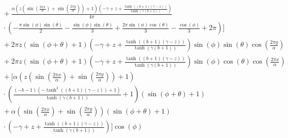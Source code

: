 \begin{align}
  &\quad + \frac{\alpha \left(z \left(\sin{\left (\frac{2 \pi x}{\alpha} \right )} + \sin{\left (\frac{2 \pi y}{\alpha} \right )}\right) + 1\right) \left(- \gamma + z + \frac{\tanh{\left (\left(b + 1\right) \left(\gamma - z\right) \right )}}{\tanh{\left (\gamma \left(b + 1\right) \right )}}\right)}{4 \pi} \nonumber\\
  &\quad \cdot \left(- \frac{\pi \sin{\left (\phi \right )} \sin{\left (\theta \right )}}{2} - \frac{\sin{\left(\phi\right)}\sin{\left(\theta\right)}}{3} + \frac{2 \pi \sin{\left (\phi \right )} \cos{\left (\theta \right )}}{3} - \frac{\cos{\left (\phi \right )}}{3} + 2 \pi\right) \Bigg] \nonumber\\
  &\quad + 2 \pi z \left(\sin{\left (\phi + \theta \right )} + 1\right) \left(- \gamma + z + \frac{\tanh{\left (\left(b + 1\right) \left(\gamma - z\right) \right )}}{\tanh{\left (\gamma \left(b + 1\right) \right )}}\right) \sin{\left (\phi \right )} \sin{\left (\theta \right )} \cos{\left (\frac{2 \pi y}{\alpha} \right )} \nonumber\\
  &\quad + 2 \pi z \left(\sin{\left (\phi + \theta \right )} + 1\right) \left(- \gamma + z + \frac{\tanh{\left (\left(b + 1\right) \left(\gamma - z\right) \right )}}{\tanh{\left (\gamma \left(b + 1\right) \right )}}\right) \sin{\left (\phi \right )} \cos{\left (\theta \right )} \cos{\left (\frac{2 \pi x}{\alpha} \right )} \nonumber\\
  &\quad + \Bigg[\alpha \left(z \left(\sin{\left (\frac{2 \pi x}{\alpha} \right )} + \sin{\left (\frac{2 \pi y}{\alpha} \right )}\right) + 1\right) \nonumber\\
  &\quad \cdot \left(\frac{\left(- b - 1\right) \left(- \tanh^{2}{\left (\left(b + 1\right) \left(\gamma - z\right) \right )} + 1\right)}{\tanh{\left (\gamma \left(b + 1\right) \right )}} + 1\right) %
  \left(\sin{\left (\phi + \theta \right )} + 1\right) \nonumber\\
  &\quad + \alpha \left(\sin{\left (\frac{2 \pi x}{\alpha} \right )} + \sin{\left (\frac{2 \pi y}{\alpha} \right )}\right) \left(\sin{\left (\phi + \theta \right )} + 1\right) \nonumber\\
  &\quad \cdot \left(- \gamma + z + \frac{\tanh{\left (\left(b + 1\right) \left(\gamma - z\right) \right )}}{\tanh{\left (\gamma \left(b + 1\right) \right )}}\right)\Bigg] \cos{\left (\phi \right )}
  \label{eqn:mms_source_expr}
\end{align}
